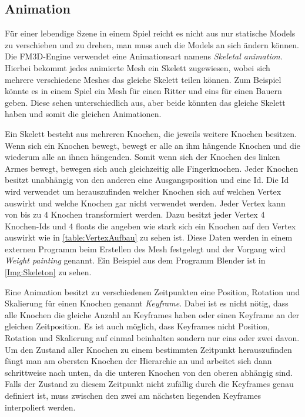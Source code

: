 \subsection{Animation}

Für einer lebendige Szene in einem Spiel reicht es nicht aus nur statische Models zu verschieben und zu drehen, man muss auch die Models an sich ändern können. Die FM3D-Engine verwendet eine Animationsart namens \textit{Skeletal animation}. Hierbei bekommt jedes animierte Mesh ein Skelett zugewiesen, wobei sich mehrere verschiedene Meshes das gleiche Skelett teilen können. Zum Beispiel könnte es in einem Spiel ein Mesh für einen Ritter und eins für einen Bauern geben. Diese sehen unterschiedlich aus, aber beide könnten das gleiche Skelett haben und somit die gleichen Animationen.

Ein Skelett besteht aus mehreren Knochen, die jeweils weitere Knochen besitzen. Wenn sich ein Knochen bewegt, bewegt er alle an ihm hängende Knochen und die wiederum alle an ihnen hängenden. Somit wenn sich der Knochen des linken Armes bewegt, bewegen sich auch gleichzeitig alle Fingerknochen. Jeder Knochen besitzt unabhängig von den anderen eine Ausgangsposition und eine Id. Die Id wird verwendet um herauszufinden welcher Knochen sich auf welchen Vertex auswirkt und welche Knochen gar nicht verwendet werden. Jeder Vertex kann von bis zu 4 Knochen transformiert werden. Dazu besitzt jeder Vertex 4 Knochen-Ids und 4 floats die angeben wie stark sich ein Knochen auf den Vertex auswirkt wie in \cref{table:VertexAufbau} zu sehen ist. Diese Daten werden in einem externen Programm beim Erstellen des Mesh festgelegt und der Vorgang wird \textit{Weight painting} genannt. Ein Beispiel aus dem Programm Blender ist in \cref{Img:Skeleton} zu sehen.

Eine Animation besitzt zu verschiedenen Zeitpunkten eine Position, Rotation und Skalierung für einen Knochen genannt \textit{Keyframe}. Dabei ist es nicht nötig, dass alle Knochen die gleiche Anzahl an Keyframes haben oder einen Keyframe an der gleichen Zeitposition. Es ist auch möglich, dass Keyframes nicht Position, Rotation und Skalierung auf einmal beinhalten sondern nur eins oder zwei davon. Um den Zustand aller Knochen zu einem bestimmten Zeitpunkt herauszufinden fängt man am obersten Knochen der Hierarchie an und arbeitet sich dann schrittweise nach unten, da die unteren Knochen von den oberen abhängig sind. Falls der Zustand zu diesem Zeitpunkt nicht zufällig durch die Keyframes genau definiert ist, muss zwischen den zwei am nächsten liegenden Keyframes interpoliert werden.

